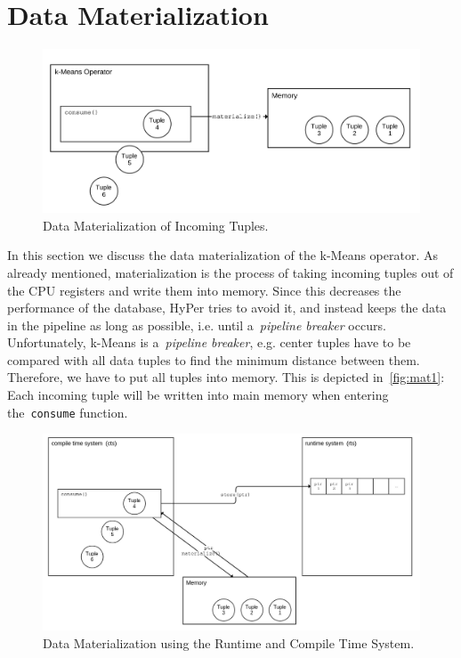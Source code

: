 \section{Data Materialization}

\begin{figure}[htsb]
  \centerline{
      \includegraphics[scale=0.05]{figures/mat1_font2}
  }
  \caption[Data Materialization of Incoming Tuples]{Data Materialization of Incoming Tuples.}
  \label{fig:mat1}
\end{figure}



In this section we discuss the data materialization of the k-Means operator. As already mentioned, materialization is the process of taking incoming tuples out of the CPU registers and write them into memory. Since this decreases the performance of the database, HyPer tries to avoid it, and instead keeps the data in the pipeline as long as possible, i.e. until a~\emph{pipeline breaker} occurs. Unfortunately, k-Means is a~\emph{pipeline breaker}, e.g. center tuples have to be compared with all data tuples to find the minimum distance between them. Therefore, we have to put all tuples into memory. This is depicted in~\autoref{fig:mat1}: Each incoming tuple will be written into main memory when entering the~\texttt{consume} function. 

\begin{figure}[htsb]
  \centerline{
  \includegraphics[scale=0.37]{figures/mat2_font4}
  }
  \caption[Data Materialization using the Runtime and Compile Time System]{Data Materialization using the Runtime and Compile Time System.}
  \label{fig:mat2}
\end{figure}

